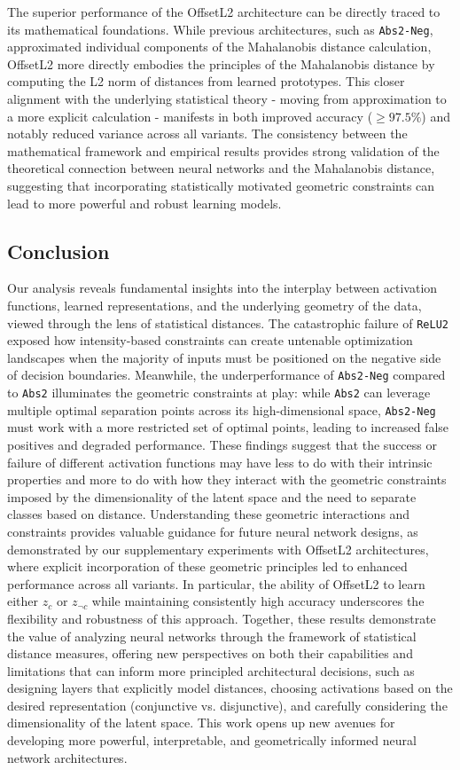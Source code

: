 The superior performance of the OffsetL2 architecture can be directly traced to its mathematical foundations. While previous architectures, such as \texttt{Abs2-Neg}, approximated individual components of the Mahalanobis distance calculation, OffsetL2 more directly embodies the principles of the Mahalanobis distance by computing the L2 norm of distances from learned prototypes. This closer alignment with the underlying statistical theory - moving from approximation to a more explicit calculation - manifests in both improved accuracy ($\geq 97.5\%$) and notably reduced variance across all variants. The consistency between the mathematical framework and empirical results provides strong validation of the theoretical connection between neural networks and the Mahalanobis distance, suggesting that incorporating statistically motivated geometric constraints can lead to more powerful and robust learning models.

\subsection{Conclusion}

Our analysis reveals fundamental insights into the interplay between activation functions, learned representations, and the underlying geometry of the data, viewed through the lens of statistical distances. The catastrophic failure of \texttt{ReLU2} exposed how intensity-based constraints can create untenable optimization landscapes when the majority of inputs must be positioned on the negative side of decision boundaries. Meanwhile, the underperformance of \texttt{Abs2-Neg} compared to \texttt{Abs2} illuminates the geometric constraints at play: while \texttt{Abs2} can leverage multiple optimal separation points across its high-dimensional space, \texttt{Abs2-Neg} must work with a more restricted set of optimal points, leading to increased false positives and degraded performance. These findings suggest that the success or failure of different activation functions may have less to do with their intrinsic properties and more to do with how they interact with the geometric constraints imposed by the dimensionality of the latent space and the need to separate classes based on distance. Understanding these geometric interactions and constraints provides valuable guidance for future neural network designs, as demonstrated by our supplementary experiments with OffsetL2 architectures, where explicit incorporation of these geometric principles led to enhanced performance across all variants. In particular, the ability of OffsetL2 to learn either $z_c$ or $z_{\neg c}$ while maintaining consistently high accuracy underscores the flexibility and robustness of this approach.  Together, these results demonstrate the value of analyzing neural networks through the framework of statistical distance measures, offering new perspectives on both their capabilities and limitations that can inform more principled architectural decisions, such as designing layers that explicitly model distances, choosing activations based on the desired representation (conjunctive vs. disjunctive), and carefully considering the dimensionality of the latent space. This work opens up new avenues for developing more powerful, interpretable, and geometrically informed neural network architectures.
